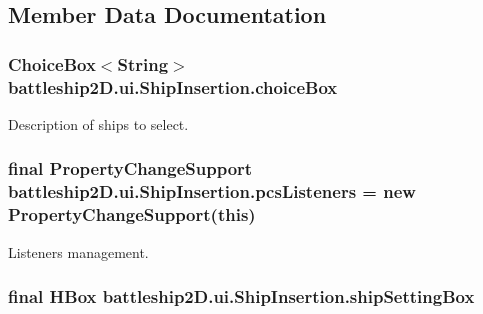\subsection{Member Data Documentation}
\hypertarget{classbattleship2D_1_1ui_1_1ShipInsertion_a90e5f0cc4613db2e51e1ac07d4aa1aa8}{
\subsubsection[{choice\-Box}]{\setlength{\rightskip}{0pt plus 5cm}Choice\-Box$<$String$>$ battleship2\-D.\-ui.\-Ship\-Insertion.\-choice\-Box\hspace{0.3cm}{\ttfamily [private]}}}\label{classbattleship2D_1_1ui_1_1ShipInsertion_a90e5f0cc4613db2e51e1ac07d4aa1aa8}


Description of ships to select. 

\hypertarget{classbattleship2D_1_1ui_1_1ShipInsertion_ac2a07a0542bd8d167ed00928ca46f0bc}{
\subsubsection[{pcs\-Listeners}]{\setlength{\rightskip}{0pt plus 5cm}final Property\-Change\-Support battleship2\-D.\-ui.\-Ship\-Insertion.\-pcs\-Listeners = new Property\-Change\-Support(this)\hspace{0.3cm}{\ttfamily [private]}}}\label{classbattleship2D_1_1ui_1_1ShipInsertion_ac2a07a0542bd8d167ed00928ca46f0bc}


Listeners management. 

\hypertarget{classbattleship2D_1_1ui_1_1ShipInsertion_ad7cafe4044e542ba6aad76742d72e291}{
\subsubsection[{ship\-Setting\-Box}]{\setlength{\rightskip}{0pt plus 5cm}final H\-Box battleship2\-D.\-ui.\-Ship\-Insertion.\-ship\-Setting\-Box\hspace{0.3cm}{\ttfamily [private]}}}\label{classbattleship2D_1_1ui_1_1ShipInsertion_ad7cafe4044e542ba6aad76742d72e291}


